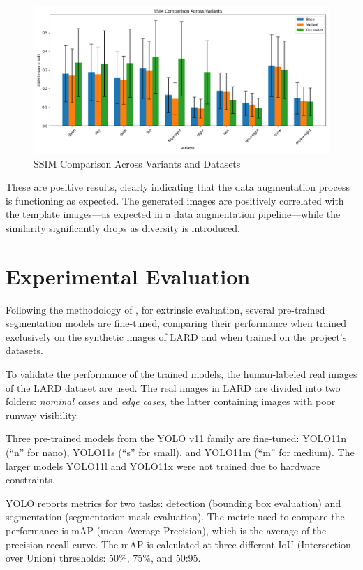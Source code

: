 \begin{figure}[htbp]
\hspace*{-2.5cm} %
\includegraphics[width=1.5\textwidth]{figures/SSIM.png}
  \caption{SSIM Comparison Across Variants and Datasets}
\end{figure}

These are positive results, clearly indicating that the data augmentation process is functioning as expected. 
The generated images are positively correlated with the template images---as expected in a data augmentation pipeline---while the similarity significantly drops as diversity is introduced.

\FloatBarrier
\section{Experimental Evaluation}

Following the methodology of \cite{voetman_big_2023}, for extrinsic evaluation, several pre-trained segmentation models are fine-tuned, comparing their performance when trained exclusively on the synthetic images of LARD \cite{ducoffe_lard_2023} and when trained on the project's datasets.

To validate the performance of the trained models, the human-labeled real images of the LARD dataset are used. The real images in LARD are divided into two folders: \emph{nominal cases} and \emph{edge cases}, the latter containing images with poor runway visibility.

Three pre-trained models from the YOLO v11 family are fine-tuned: YOLO11n (``n'' for nano), YOLO11s (``s'' for small), and YOLO11m (``m'' for medium). The larger models YOLO11l and YOLO11x were not trained due to hardware constraints.

YOLO reports metrics for two tasks: detection (bounding box evaluation) and
segmentation (segmentation mask evaluation). The metric used to compare the
performance is mAP (mean Average Precision), which is the average of the
precision-recall curve. The mAP is calculated at three different IoU (Intersection over Union) thresholds: 50\%, 75\%, and 50:95.

